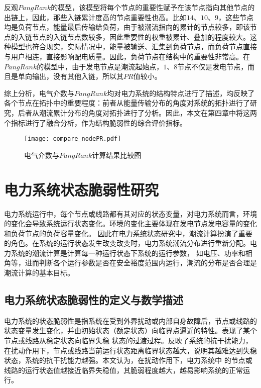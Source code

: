 反观$PangRank$的模型，该模型将每个节点的重要性赋予在该节点指向其他节点的出链上，因此，那些入链累计度高的节点重要性也高。比如$14$、$10$、$9$，这些节点均是负荷节点，能量最后传输给负荷，由于被潮流指向的累计的节点较多，即该节点的入链节点的入链节点数较多，因此重要性的权重被累计、叠加的程度较大。这种模型也符合现实，实际情况中，能量被输送、汇集到负荷节点，而负荷节点直接与用户相连，直接影响配电质量。因此，负荷节点在结构中的重要性非常高。在$PangRank$的模型中，由于发电节点是潮流起始点，$1$、$8$节点不仅是发电节点，而且是单向输出，没有其他入链，所以其$PR$值较小。

综上分析，电气介数与$PangRank$均对电力系统的结构特点进行了描述，均反映了各个节点在拓扑中的重要程度：前者从能量传输分布的角度对系统的拓扑进行了研究，后者从潮流累计分布的角度对拓扑进行了分析。因此，本文在第四章中将这两个指标进行了融合分析，作为结构脆弱性的综合评价指标。

\begin{figure}[H] %
  \centering
  \texttt{[image: compare\_nodePR.pdf]}
  \caption{电气介数与$PangRank$计算结果比较图}
  \label{fig:compare_nodePR}
\end{figure}

\section{电力系统状态脆弱性研究}
\label{sec:status}

电力系统运行中，每个节点或线路都有其对应的状态变量，对电力系统而言，环境的变化会导致系统运行状态变化。环境的变化主要体现在发电节点发电容量的变化和负荷节点的负荷容量变化。
因此在电力系统状态研究中，潮流计算扮演了重要的角色。在系统的运行状态发生改变改变时，电力系统潮流分布进行重新分配。电力系统的潮流计算是计算每一种运行状态下系统的运行参数，
如电压、功率和相角等，进而判断各个运行参数是否在安全裕度范围内运行，潮流的分布是否合理是潮流计算的基本目标。


\subsection{电力系统状态脆弱性的定义与数学描述}
\label{sec:vulneStaus}

电力系统的状态脆弱性是指系统在受到外界扰动或内部自身故障后，节点或线路的状态变量发生变化，并由初始状态（额定状态）向临界点逼近的特性。表现了某个节点或线路从稳定状态向临界失稳
状态的过渡过程。反映了系统的抗干扰能力，在扰动作用下，节点或线路当前运行状态距离临界状态越大，说明其越难达到失稳状态，系统的抗干扰能力越强。本文认为，在扰动作用下，电力系统中
的节点或线路的运行状态值越接近临界失稳值，其脆弱程度越大，越易影响系统的正常运行。

